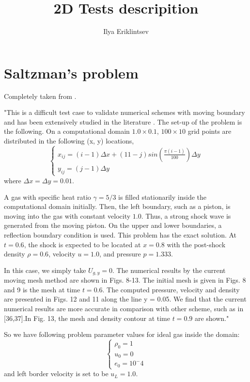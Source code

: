 \documentclass[10pt,a4paper]{article}
\author{Ilya Eriklintsev}
\title{2D Tests descripition}
\begin{document}
\section{Saltzman's problem} 
Completely taken from \cite{Ni2013}.

"This is a difficult test case to validate numerical schemes with moving boundary and has been extensively studied in the literature \cite{Dukowicz1992}. The set-up of the problem is the following. On a computational domain $ 1.0 \times 0.1$, $100 \times 10$ grid points are distributed in the following (x, y) locations,
\[
 \begin{cases}
   x_{ij} = (i-1) \Delta x + (11 - j) sin(\frac{\pi (i-1)}{100}) \Delta y \\
   y_{ij} = (j-1) \Delta y
  \end{cases}
\]
where $\Delta x = \Delta y = 0.01$.

A gas with specific heat ratio $\gamma = 5/3 $ is filled stationarily inside
the computational domain initially. Then, the left boundary, such as a piston, is moving into the gas with constant velocity $1.0$. Thus, a strong shock wave is generated from the moving piston. On the upper and lower boundaries, a reflection boundary condition is used. This problem has the exact solution. At $t = 0.6$, the shock is expected to be located at $x = 0.8$ with the post-shock density $\rho = 0.6$, velocity $u = 1.0$, and pressure $p = 1.333$. 

In this case, we simply take $U_{g,y} = 0$. The numerical results by the current moving mesh method are shown in Figs. 8-13. The initial mesh is given in Figs. 8 and 9 is the mesh at time $t = 0.6$. The computed pressure, velocity and density are presented in Figs. 12 and 11 along the line y = 0.05. We find that the current numerical results are more accurate in comparison with other scheme, such as in [36,37].In Fig. 13, the mesh and density contour at time $t = 0.9$ are shown."

So we have following problem parameter values for ideal gas inside the domain:
\[
  \begin{cases}
    \rho_{0} = 1 \\
    u_{0} = 0 \\
    e_{0} = 10^-4
  \end{cases}
\]
and left border velocity is set to be $u_{L} = 1.0$.

\medskip
 
\printbibliography
\end{document}
